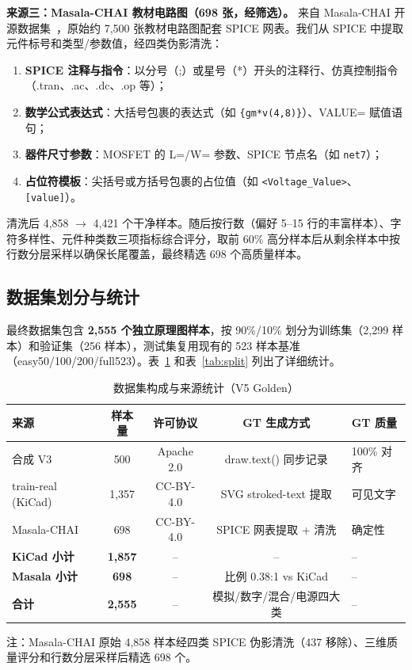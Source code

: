 \textbf{来源三：Masala-CHAI 教材电路图（698 张，经筛选）。} 来自 Masala-CHAI 开源数据集~\citep{bhandari2025masalachai}，原始约 7,500 张教材电路图配套 SPICE 网表。我们从 SPICE 中提取元件标号和类型/参数值，经四类伪影清洗：
\begin{enumerate}[nosep]
    \item \textbf{SPICE 注释与指令}：以分号（;）或星号（*）开头的注释行、仿真控制指令（.tran、.ac、.dc、.op 等）；
    \item \textbf{数学公式表达式}：大括号包裹的表达式（如 \texttt{\{gm*v(4,8)\}}）、VALUE= 赋值语句；
    \item \textbf{器件尺寸参数}：MOSFET 的 L=/W= 参数、SPICE 节点名（如 \texttt{net7}）；
    \item \textbf{占位符模板}：尖括号或方括号包裹的占位值（如 \texttt{<Voltage\_Value>}、\texttt{[value]}）。
\end{enumerate}
清洗后 4,858 $\to$ 4,421 个干净样本。随后按行数（偏好 5--15 行的丰富样本）、字符多样性、元件种类数三项指标综合评分，取前 60\% 高分样本后从剩余样本中按行数分层采样以确保长尾覆盖，最终精选 698 个高质量样本。

\subsection{数据集划分与统计}

最终数据集包含 \textbf{2,555 个独立原理图样本}，按 90\%/10\% 划分为训练集（2,299 样本）和验证集（256 样本），测试集复用现有的 523 样本基准（easy50/100/200/full523）。表~\ref{tab:dataset} 和表~\ref{tab:split} 列出了详细统计。

\begin{table}[h]
\centering
\caption{数据集构成与来源统计（V5 Golden）}
\label{tab:dataset}
\begin{tabular}{lcccl}
\toprule
\textbf{来源} & \textbf{样本量} & \textbf{许可协议} & \textbf{GT 生成方式} & \textbf{GT 质量} \\
\midrule
合成 V3           & 500   & Apache 2.0 & draw.text() 同步记录      & 100\% 对齐 \\
train-real (KiCad)& 1,357 & CC-BY-4.0  & SVG stroked-text 提取    & 可见文字 \\
Masala-CHAI       & 698   & CC-BY-4.0  & SPICE 网表提取 + 清洗    & 确定性 \\
\midrule
\textbf{KiCad 小计}& \textbf{1,857} & -- & -- & -- \\
\textbf{Masala 小计}& \textbf{698} & -- & 比例 0.38:1 vs KiCad & -- \\
\midrule
\textbf{合计}      & \textbf{2,555} & -- & 模拟/数字/混合/电源四大类 & -- \\
\bottomrule
\end{tabular}
\par\smallskip
{\small\noindent 注：Masala-CHAI 原始 4,858 样本经四类 SPICE 伪影清洗（437 移除）、三维质量评分和行数分层采样后精选 698 个。}
\end{table}

